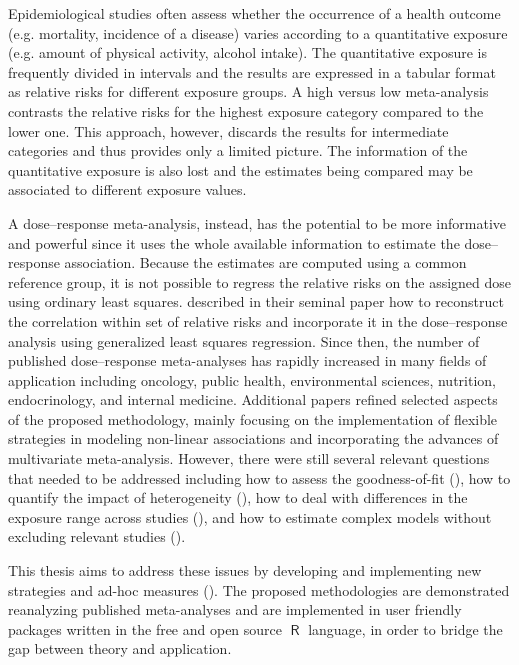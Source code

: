 \documentclass[11pt,a4paper,twoside,openany]{book}\usepackage{knitr}
\DeclareMathOperator{\R}{\textsf{R}}
\begin{document}
{Epidemiological studies often assess whether the occurrence of a health outcome (e.g. mortality, incidence of a disease) varies according to a quantitative exposure (e.g. amount of physical activity, alcohol intake). 
The quantitative exposure is frequently divided in intervals and the results are expressed in a tabular format as relative risks for different exposure groups. A high versus low meta-analysis contrasts the relative risks for the highest exposure category compared to the lower one. This approach, however, discards the results for intermediate categories and thus provides only a limited picture. The information of the quantitative exposure is also lost and the estimates being compared may be associated to different exposure values.

A dose--response meta-analysis, instead, has the potential to be more informative and powerful since it uses the whole available information to estimate the dose--response association. Because the estimates are computed using a common reference group, it is not possible to regress the relative risks on the assigned dose using ordinary least squares. \cite{greenland1992methods} described in their seminal paper how to reconstruct the correlation within set of relative risks and incorporate it in the dose--response analysis using generalized least squares regression. Since then, the number of published dose--response meta-analyses has rapidly increased in many fields of application including oncology, public health, environmental sciences, nutrition, endocrinology, and internal medicine. 
Additional papers refined selected aspects of the proposed methodology, mainly focusing on the implementation of flexible strategies in modeling non-linear associations and incorporating the advances of multivariate meta-analysis. However, there were still several relevant questions that needed to be addressed including how to assess the goodness-of-fit (), how to quantify the impact of heterogeneity (), how to deal with differences in the exposure range across studies (), and how to estimate complex models without excluding relevant studies ().

This thesis aims to address these issues by developing and implementing new strategies and ad-hoc measures (). The proposed methodologies are demonstrated reanalyzing published meta-analyses and are implemented in user friendly packages written in the free and open source $\R$ language, in order to bridge the gap between theory and application.

}
\end{document}
